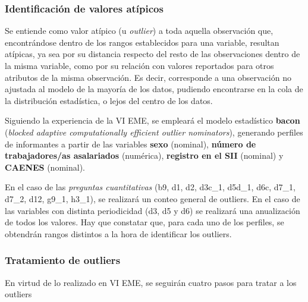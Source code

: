 \documentclass[
]{article}
\begin{document}
\hypertarget{identificaciuxf3n-de-valores-atuxedpicos}{%
\subsubsection{Identificación de valores atípicos}\label{identificaciuxf3n-de-valores-atuxedpicos}}

Se entiende como valor atípico (u \emph{outlier}) a toda aquella observación que, encontrándose dentro de los rangos establecidos para una variable, resultan atípicas, ya sea por su distancia respecto del resto de las observaciones dentro de la misma variable, como por su relación con valores reportados para otros atributos de la misma observación. Es decir, corresponde a una observación no ajustada al modelo de la mayoría de los datos, pudiendo encontrarse en la cola de la distribución estadística, o lejos del centro de los datos.

Siguiendo la experiencia de la VI EME, se empleará el modelo estadístico \textbf{bacon} (\emph{blocked adaptive computationally efficient outlier nominators}), generando perfiles de informantes a partir de las variables \textbf{sexo} (nominal), \textbf{número de trabajadores/as asalariados} (numérica), \textbf{registro en el SII} (nominal) y \textbf{CAENES} (nominal).

En el caso de las \emph{preguntas cuantitativas} (b9, d1, d2, d3c\_1, d5d\_1, d6c, d7\_1, d7\_2, d12, g9\_1, h3\_1), se realizará un conteo general de outliers. En el caso de las variables con distinta periodicidad (d3, d5 y d6) se realizará una anualización de todos los valores. Hay que constatar que, para cada uno de los perfiles, se obtendrán rangos distintos a la hora de identificar los outliers.

\hypertarget{tratamiento-de-outliers}{%
\subsubsection{Tratamiento de outliers}\label{tratamiento-de-outliers}}

En virtud de lo realizado en VI EME, se seguirán cuatro pasos para tratar a los outliers
\end{document}
